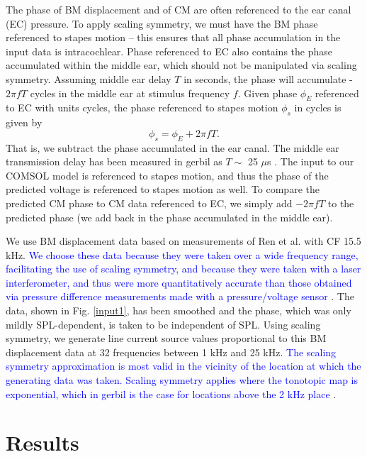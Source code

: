\documentclass{biophys-new}
\begin{document}
\par{The phase of BM displacement and of CM are often referenced to the ear canal (EC) pressure. To apply scaling symmetry, we must have the BM phase referenced to stapes motion -- this ensures that all phase accumulation in the input data is intracochlear. Phase referenced to EC also contains the phase accumulated within the middle ear, which should not be manipulated via scaling symmetry. Assuming middle ear delay $T$ in seconds, the phase will accumulate -$2\pi fT$ cycles in the middle ear at stimulus frequency $f$. Given phase $\phi_E$ referenced to EC with units cycles, the phase referenced to stapes motion $\phi_s$ in cycles is given by
\begin{equation}\phi_s = \phi_E + 2\pi fT.\end{equation}
That is, we subtract the phase accumulated in the ear canal. The middle ear transmission delay has been measured in gerbil as $T \sim$ 25 $\mu$s \cite{Olson1998}. The input to our COMSOL model is referenced to stapes motion, and thus the phase of the predicted voltage is referenced to stapes motion as well. To compare the predicted CM phase to CM data referenced to EC, we simply add $-2 \pi fT$ to the predicted phase (we add back in the phase accumulated in the middle ear).}
\par{We use BM displacement data based on measurements of Ren et al. \cite{RenPlos2011} with CF 15.5 kHz. \textcolor{blue}{We choose these data because they were taken over a wide frequency range, facilitating the use of scaling symmetry, and because they were taken with a laser interferometer, and thus were more quantitatively accurate than those obtained via pressure difference measurements made with a pressure/voltage sensor \cite{dongolson}}. The data, shown in Fig. \ref{input1}, has been smoothed and the phase, which was only mildly SPL-dependent, is taken to be independent of SPL.  Using scaling symmetry, we generate line current source values proportional to this BM displacement data at 32 frequencies between 1 kHz and 25 kHz. {\textcolor{blue}{The scaling symmetry approximation is most valid in the vicinity of the location at which the generating data was taken. Scaling symmetry applies where the tonotopic map is exponential, which in gerbil is the case for locations above the 2 kHz place \cite{muller}}.}}

\section{Results}
\end{document}
